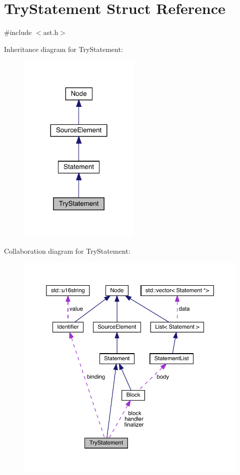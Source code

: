 \hypertarget{struct_try_statement}{}\section{Try\+Statement Struct Reference}
\label{struct_try_statement}


{\ttfamily \#include $<$ast.\+h$>$}



Inheritance diagram for Try\+Statement\+:
\nopagebreak
\begin{figure}[H]
\begin{center}
\leavevmode
\includegraphics[width=164pt]{struct_try_statement__inherit__graph}
\end{center}
\end{figure}


Collaboration diagram for Try\+Statement\+:
\nopagebreak
\begin{figure}[H]
\begin{center}
\leavevmode
\includegraphics[width=350pt]{struct_try_statement__coll__graph}
\end{center}
\end{figure}
